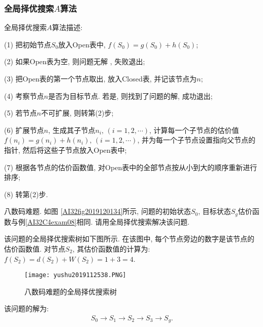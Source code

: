 \subsubsection{全局择优搜索$A$算法}
全局择优搜索$A$算法描述:

\quad   (1) 把初始节点$S_0$放入Open表中, $f(S_0)=g(S_0)+h(S_0)$;

\quad   (2) 如果Open表为空, 则问题无解 , 失败退出;

\quad   (3) 把Open表的第一个节点取出, 放入Closed表, 并记该节点为$n$;

\quad   (4) 考察节点$n$是否为目标节点. 若是, 则找到了问题的解, 成功退出;

\quad   (5) 若节点$n$不可扩展, 则转第(2)步;

\quad   (6) 扩展节点$n$, 生成其子节点$n_i,\,(i=1, 2,\cdots)$, 计算每一个子节点的估价值$f(n_i)=g(n_i)+h(n_i),\,(i=1, 2, \cdots)$, 并为每一个子节点设置指向父节点的指针, 然后将这些子节点放入Open表中;

\quad   (7) 根据各节点的估价函数值, 对Open表中的全部节点按从小到大的顺序重新进行排序;

\quad   (8) 转第(2)步.
\begin{example}
    八数码难题. 如图 \ref{AI32fig2019120134}所示, 问题的初始状态$S_0$, 目标状态$S_g$估价函数与例\ref{AI32C4exam08}相同. 请用全局择优搜索解决该问题.
\end{example}
\begin{result}
    该问题的全局择优搜索树如下图所示. 在该图中, 每个节点旁边的数字是该节点的估价函数值.
    对节点$S_2$, 其估价函数值的计算为: $f(S_2)=d(S_2)+W(S_2) =1+3=4$.
\begin{figure}[H]
    \centering
    \texttt{[image: yushu2019112538.PNG]}
    \caption{八数码难题的全局择优搜索树}
    \label{AI32fig38}
\end{figure}
该问题的解为:
\begin{align}
    S_0\rightarrow S_1\rightarrow S_2\rightarrow S_3\rightarrow S_g.
\end{align}
\end{result}
